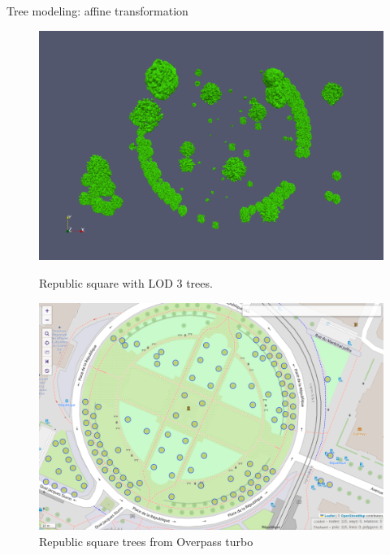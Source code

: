 \documentclass[10pt]{beamer}
\begin{document}
\begin{frame}{Tree modeling: affine transformation}
\begin{figure}[H]
  \centering
  \begin{minipage}{0.49\textwidth}
      \centering
      \includegraphics[width=1\textwidth]{images/republic_lod3.png}
      \caption{Republic square with LOD 3 trees.}
  \end{minipage}\hfill
  \begin{minipage}{0.49\textwidth}
      \centering
      \includegraphics[width=1\textwidth]{images/republic_overpassturbo.png}
      \caption{Republic square trees from Overpass turbo\cite{overpass-turbo}}
  \end{minipage}
\end{figure}
\end{frame}
\end{document}
